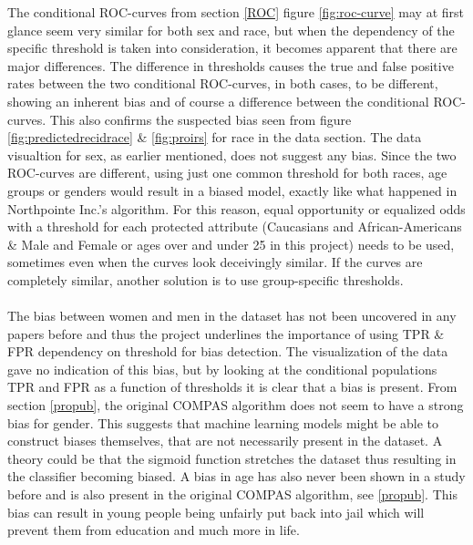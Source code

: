 \documentclass[11pt, fleqn, titlepage]{article}
\begin{document}
	The conditional ROC-curves from section \ref{ROC} figure \ref{fig:roc-curve} may at first glance seem very similar for both sex and race, but when the dependency of the specific threshold is taken into consideration, it becomes apparent that there are major differences. The difference in thresholds causes the true and false positive rates between the two conditional ROC-curves, in both cases, to be different, showing an inherent bias and of course a difference between the conditional ROC-curves. This also confirms the suspected bias seen from figure \ref{fig:predictedrecidrace} \& \ref{fig:proirs} for race in the data section. The data visualtion for sex, as earlier mentioned, does not suggest any bias. Since the two ROC-curves are different, using just one common threshold for both races, age groups or genders would result in a biased model, exactly like what happened in Northpointe Inc.'s algorithm. For this reason, equal opportunity or equalized odds with a threshold for each protected attribute (Caucasians and African-Americans \& Male and Female or ages over and under 25 in this project) needs to be used, sometimes even when the curves look deceivingly similar. If the curves are completely similar, another solution is to use group-specific thresholds. \\\\
	\noindent
	The bias between women and men in the dataset has not been uncovered in any papers before and thus the project underlines the importance of using TPR \& FPR dependency on threshold for bias detection. The visualization of the data gave no indication of this bias, but by looking at the conditional populations TPR and FPR as a function of thresholds it is clear that a bias is present. From section \ref{propub}, the original COMPAS algorithm does not seem to have a strong bias for gender. This suggests that machine learning models might be able to construct biases themselves, that are not necessarily present in the dataset. A theory could be that the sigmoid function stretches the dataset thus resulting in the classifier becoming biased. A bias in age has also never been shown in a study before and is also present in the original COMPAS algorithm, see \ref{propub}. This bias can result in young people being unfairly put back into jail which will prevent them from education and much more in life. \\\\ 
	\noindent
\end{document}

